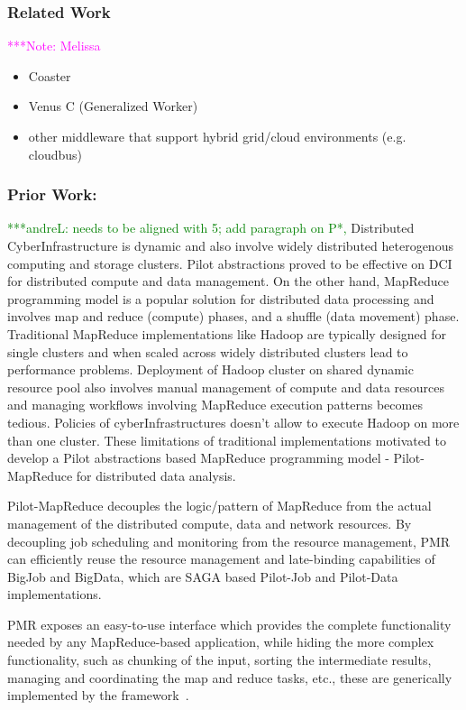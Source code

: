 \documentclass[times]{cpeauth}
\newcommand{\alnote}[1]{ {\textcolor{green} { ***andreL: #1 }}}
\newcommand{\note}[1]{ {\textcolor{magenta} { ***Note: #1 }}}
\newcommand{\alnote}[1]{}
\newcommand{\note}[1]{}
\begin{document}
\subsubsection*{Related Work} 
\note{Melissa}

\begin{itemize}
	\item Coaster
	\item Venus C (Generalized Worker)
	\item other middleware that support hybrid grid/cloud environments (e.g. cloudbus)
\end{itemize}

\subsubsection*{Prior Work:}
\alnote{needs to be aligned with 5; add paragraph on P*, }
Distributed CyberInfrastructure is dynamic and also involve widely distributed
heterogenous computing and storage clusters. Pilot abstractions proved to be
effective on DCI for distributed compute and data management. On the other
hand, MapReduce programming model is a popular solution for distributed data
processing and involves map and reduce (compute) phases, and a shuffle (data
movement) phase. Traditional MapReduce implementations like Hadoop are
typically designed for single clusters and when scaled across widely
distributed clusters lead to performance problems. Deployment of Hadoop
cluster on shared dynamic resource pool also involves manual management of
compute and data resources and managing workflows involving MapReduce
execution patterns becomes tedious. Policies of cyberInfrastructures doesn't
allow to execute Hadoop on more than one cluster. These limitations of
traditional implementations motivated to develop a Pilot abstractions based
MapReduce programming model - Pilot-MapReduce for distributed data analysis.

Pilot-MapReduce decouples the logic/pattern of MapReduce from the actual
management of the distributed compute, data and network resources. By
decoupling job scheduling and monitoring from the resource management, PMR can
efficiently reuse the resource management and late-binding capabilities of
BigJob and BigData, which are SAGA based Pilot-Job and Pilot-Data
implementations.

PMR exposes an easy-to-use interface which provides the complete functionality
needed by any MapReduce-based application, while hiding the more complex
functionality, such as chunking of the input, sorting the intermediate
results, managing and coordinating the map and reduce tasks, etc., these are
generically implemented by the
framework~\cite{Mantha:2012:PEF:2287016.2287020}.
\end{document}

